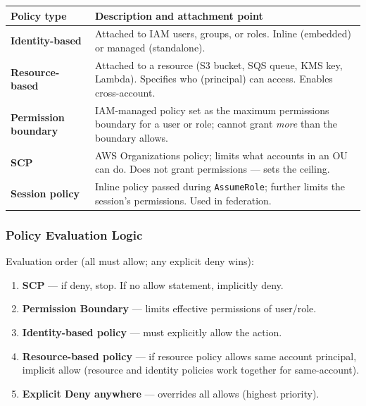 \begin{comparebox}[title={IAM policy types}]
\begin{tabular}{@{}p{3.5cm}p{8cm}@{}}
\toprule
\textbf{Policy type} & \textbf{Description and attachment point} \\
\midrule
\textbf{Identity-based}      & Attached to IAM users, groups, or roles.
                                Inline (embedded) or managed (standalone). \\[3pt]
\textbf{Resource-based}      & Attached to a resource (S3 bucket, SQS queue, KMS key, Lambda).
                                Specifies who (principal) can access. Enables cross-account. \\[3pt]
\textbf{Permission boundary} & IAM-managed policy set as the maximum permissions boundary for
                                a user or role; cannot grant \emph{more} than the boundary allows. \\[3pt]
\textbf{SCP}                 & AWS Organizations policy; limits what accounts in an OU can do.
                                Does not grant permissions --- sets the ceiling. \\[3pt]
\textbf{Session policy}      & Inline policy passed during \texttt{AssumeRole}; further limits
                                the session's permissions. Used in federation. \\
\bottomrule
\end{tabular}
\end{comparebox}

\subsubsection{Policy Evaluation Logic}

Evaluation order (all must allow; any explicit deny wins):
\begin{enumerate}
  \item \textbf{SCP} --- if deny, stop. If no allow statement, implicitly deny.
  \item \textbf{Permission Boundary} --- limits effective permissions of user/role.
  \item \textbf{Identity-based policy} --- must explicitly allow the action.
  \item \textbf{Resource-based policy} --- if resource policy allows same account principal,
        implicit allow (resource and identity policies work together for same-account).
  \item \textbf{Explicit Deny anywhere} --- overrides all allows (highest priority).
\end{enumerate}

